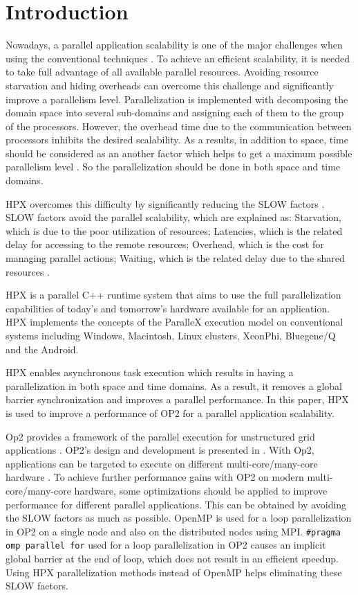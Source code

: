 \documentclass[conference]{IEEEtran}
\begin{document}
\section{Introduction}
Nowadays, a parallel application scalability is one of the major challenges when using the conventional techniques \cite{r11,r12}. To achieve an efficient scalability, it is needed to take full advantage of all available parallel resources. Avoiding resource starvation and hiding overheads can overcome this challenge and significantly improve a parallelism level. Parallelization is implemented with decomposing the domain space into several sub-domains and assigning each of them to the group of the processors. However, the overhead time due to the communication between processors inhibits the desired scalability. As a results, in addition to space, time should be considered as an another factor which helps to get a maximum possible parallelism level\cite{r7} \cite{r14}. So the parallelization should be done in both space and time domains. 

HPX \cite{r19} overcomes this difficulty by significantly reducing the SLOW factors \cite{r6}. SLOW factors avoid the parallel scalability, which are explained as: Starvation, which is due to the poor utilization of resources; Latencies, which is the related delay for accessing to the remote resources; Overhead, which is the cost for managing parallel actions; Waiting, which is the related delay due to the shared resources \cite{r7}. 

HPX is a parallel C++ runtime system that aims to use the full parallelization capabilities of today's and tomorrow's hardware available for an application. HPX implements the concepts of the ParalleX execution model \cite{o9,o10,o11} on conventional systems including Windows, Macintosh, Linux clusters, XeonPhi, Bluegene/Q and the Android. 

 HPX enables asynchronous task execution which results in having a parallelization in both space and time domains. As a result, it removes a global barrier synchronization and improves a parallel performance. In this paper, HPX is used to improve a performance of OP2 for a parallel application scalability.

Op2 provides a framework of the parallel execution for unstructured grid applications \cite{o1}. OP2's design and development is presented in \cite{o2,o12}. With Op2, applications can be targeted to execute on different multi-core/many-core hardware \cite{o2,o3}. To achieve further performance gains with OP2 on modern multi-core/many-core hardware, some optimizations should be applied to improve performance for different parallel applications. This can be obtained by avoiding the SLOW factors as much as possible. OpenMP is used for a loop parallelization in OP2 on a single node and also on the distributed nodes using MPI. \texttt{\#pragma omp parallel for} used for a loop parallelization in OP2 causes an implicit global barrier at the end of loop, which does not result in an efficient speedup. Using HPX parallelization methods instead of OpenMP helps eliminating these SLOW factors.
\end{document}
